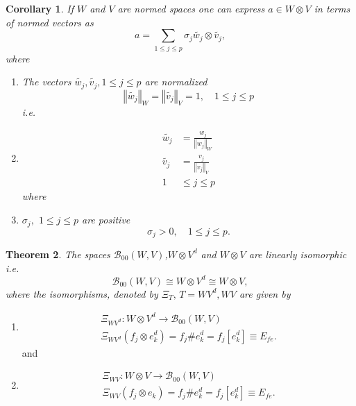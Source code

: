 \documentclass[aps,preprint]{revtex4}%
\newtheorem{theorem}{Theorem}
\newtheorem{corollary}[theorem]{Corollary}
\begin{document}
\begin{corollary}
If $W$ and $V$ are normed spaces one can express $a\in W\otimes V$ in terms of
normed vectors as
\begin{equation}
a=\sum_{1\leq j\leq p}\sigma_{j}\widetilde{w_{j}}\otimes\widetilde{v_{j}},
\end{equation}
where

\begin{enumerate}
\item The vectors $\widetilde{w_{j}},\widetilde{v_{j}},1\leq j\leq p$ are
normalized
\begin{equation}
\left\Vert \widetilde{w_{j}}\right\Vert _{W}=\left\Vert \widetilde{v_{j}%
}\right\Vert _{V}=1,\quad1\leq j\leq p
\end{equation}
i.e.

\item
\begin{align}
\widetilde{w_{j}}  &  =\frac{w_{j}}{\left\Vert w_{j}\right\Vert _{W}}\\
\widetilde{v_{j}}  &  =\frac{v_{j}}{\left\Vert v_{j}\right\Vert _{V}}\\
1  &  \leq j\leq p
\end{align}
where

\item $\sigma_{j},$ $1\leq j\leq p$ are positive
\begin{equation}
\sigma_{j}>0,\quad1\leq j\leq p.
\end{equation}

\end{enumerate}
\end{corollary}

\begin{theorem}
The spaces $\mathcal{B}_{00}\left(  W,V\right)  $,$W\otimes V^{d}$ and
$W\otimes V$ are linearly isomorphic i.e.
\begin{equation}
\mathcal{B}_{00}\left(  W,V\right)  \cong W\otimes V^{d}\cong W\otimes V,
\end{equation}
where the isomorphisms, denoted by $\Xi_{T},\,T=WV^{d},WV$ are given by
\end{theorem}

\begin{enumerate}
\item
\begin{gather}
\Xi_{WV^{d}}:W\otimes V^{d}\rightarrow\mathcal{B}_{00}\left(  W,V\right) \\
\Xi_{WV^{d}}\left(  f_{j}\otimes e_{k}^{d}\right)  =f_{j}\#e_{k}^{d}%
=f_{j}\left[  e_{k}^{d}\right]  \equiv E_{fe}.
\end{gather}
and

\item
\begin{gather}
\Xi_{WV}:W\otimes V\rightarrow\mathcal{B}_{00}\left(  W,V\right) \\
\Xi_{WV}\left(  f_{j}\otimes e_{k}\right)  =f_{j}\#e_{k}^{d}=f_{j}\left[
e_{k}^{d}\right]  \equiv E_{fe}.
\end{gather}

\end{enumerate}
\end{document}
